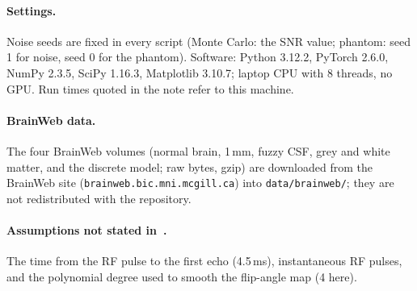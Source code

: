 \paragraph{Settings.} Noise seeds are fixed in every script (Monte Carlo: the SNR value; phantom:
seed 1 for noise, seed 0 for the phantom). Software: Python 3.12.2, PyTorch 2.6.0, NumPy 2.3.5,
SciPy 1.16.3, Matplotlib 3.10.7; laptop CPU with 8 threads, no GPU. Run times quoted in the note
refer to this machine.

\paragraph{BrainWeb data.} The four BrainWeb volumes (normal brain, 1\,mm, fuzzy CSF, grey and white
matter, and the discrete model; raw bytes, gzip) are downloaded from the BrainWeb site (\texttt{brainweb.bic.mni.mcgill.ca}) into \texttt{data/brainweb/}; they are not
redistributed with the repository.

\paragraph{Assumptions not stated in~\cite{cheng2019}.} The time from the RF pulse to the first
echo (4.5\,ms), instantaneous RF pulses, and the polynomial degree used to smooth the flip-angle
map (4 here).

